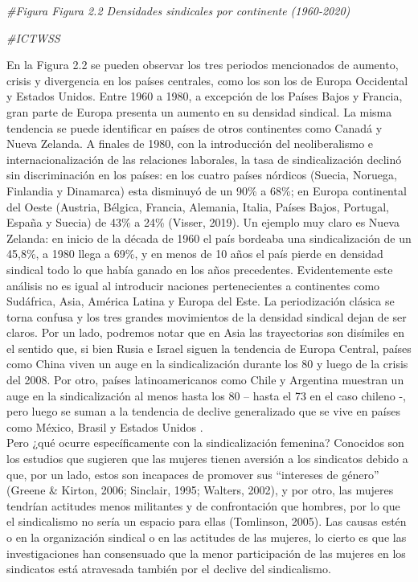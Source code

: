 \documentclass[
]{book}
\newenvironment{Shaded}{\begin{snugshade}}{\end{snugshade}}
\newcommand{\CommentTok}[1]{\textcolor[rgb]{0.56,0.35,0.01}{\textit{#1}}}
\begin{document}
\begin{Shaded}
\begin{Highlighting}[]
\CommentTok{#Figura Figura 2.2 Densidades sindicales por continente (1960-2020)}

\CommentTok{#ICTWSS}
\end{Highlighting}
\end{Shaded}

En la Figura 2.2 se pueden observar los tres periodos mencionados de aumento, crisis y divergencia en los países centrales, como los son los de Europa Occidental y Estados Unidos. Entre 1960 a 1980, a excepción de los Países Bajos y Francia, gran parte de Europa presenta un aumento en su densidad sindical. La misma tendencia se puede identificar en países de otros continentes como Canadá y Nueva Zelanda. A finales de 1980, con la introducción del neoliberalismo e internacionalización de las relaciones laborales, la tasa de sindicalización declinó sin discriminación en los países: en los cuatro países nórdicos (Suecia, Noruega, Finlandia y Dinamarca) esta disminuyó de un 90\% a 68\%; en Europa continental del Oeste (Austria, Bélgica, Francia, Alemania, Italia, Países Bajos, Portugal, España y Suecia) de 43\% a 24\% (Visser, 2019). Un ejemplo muy claro es Nueva Zelanda: en inicio de la década de 1960 el país bordeaba una sindicalización de un 45,8\%, a 1980 llega a 69\%, y en menos de 10 años el país pierde en densidad sindical todo lo que había ganado en los años precedentes. Evidentemente este análisis no es igual al introducir naciones pertenecientes a continentes como Sudáfrica, Asia, América Latina y Europa del Este. La periodización clásica se torna confusa y los tres grandes movimientos de la densidad sindical dejan de ser claros. Por un lado, podremos notar que en Asia las trayectorias son disímiles en el sentido que, si bien Rusia e Israel siguen la tendencia de Europa Central, países como China viven un auge en la sindicalización durante los 80 y luego de la crisis del 2008. Por otro, países latinoamericanos como Chile y Argentina muestran un auge en la sindicalización al menos hasta los 80 -- hasta el 73 en el caso chileno -, pero luego se suman a la tendencia de declive generalizado que se vive en países como México, Brasil y Estados Unidos .\\
Pero ¿qué ocurre específicamente con la sindicalización femenina? Conocidos son los estudios que sugieren que las mujeres tienen aversión a los sindicatos debido a que, por un lado, estos son incapaces de promover sus ``intereses de género'' (Greene \& Kirton, 2006; Sinclair, 1995; Walters, 2002), y por otro, las mujeres tendrían actitudes menos militantes y de confrontación que hombres, por lo que el sindicalismo no sería un espacio para ellas (Tomlinson, 2005). Las causas estén o en la organización sindical o en las actitudes de las mujeres, lo cierto es que las investigaciones han consensuado que la menor participación de las mujeres en los sindicatos está atravesada también por el declive del sindicalismo.
\end{document}
